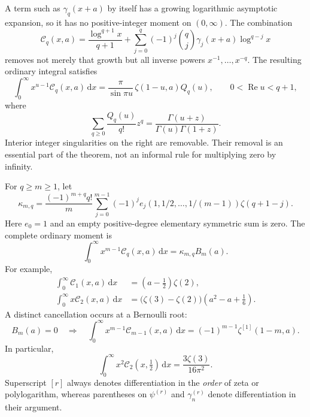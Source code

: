 \documentclass[11pt,letterpaper]{article}
\numberwithin{equation}{section}
\theoremstyle{definition}\newtheorem{definition}[theorem]{Definition}
\theoremstyle{remark}\newtheorem{remark}[theorem]{Remark}
\DeclareMathOperator{\Ree}{Re}
\newcommand{\dd}{\,\mathrm{d}}
\newcommand{\Ccal}{\mathcal C}
\newcommand{\Qcal}{Q}
\begin{document}
A term such as $\gamma_q(x+a)$ by itself has a growing logarithmic
asymptotic expansion, so it has no positive-integer moment on
$(0,\infty)$. The combination
\begin{equation}\label{bsm:eq:C-intro}
 \Ccal_q(x,a)=\frac{\log^{q+1}x}{q+1}
 +\sum_{j=0}^{q}(-1)^j\binom qj\gamma_j(x+a)\log^{q-j}x
\end{equation}
removes not merely that growth but all inverse powers $x^{-1},\ldots,x^{-q}$.
The resulting ordinary integral satisfies
\begin{equation}\label{bsm:eq:intro-master}
 \int_0^\infty x^{u-1}\Ccal_q(x,a)\dd x
 =\frac{\pi}{\sin\pi u}\,\zeta(1-u,a)\Qcal_q(u),
 \qquad 0<\Ree u<q+1,
\end{equation}
where
\begin{equation}\label{bsm:eq:intro-Q}
 \sum_{q\ge0}\frac{\Qcal_q(u)}{q!}z^q
 =\frac{\Gamma(u+z)}{\Gamma(u)\Gamma(1+z)}.
\end{equation}
Interior integer singularities on the right are removable. Their
removal is an essential part of the theorem, not an informal rule for
multiplying zero by infinity.

For $q\ge m\ge1$, let
\begin{equation}\label{bsm:eq:intro-kappa}
 \kappa_{m,q}=\frac{(-1)^{m+q}q!}{m}
 \sum_{j=0}^{m-1}(-1)^j e_j(1,1/2,\ldots,1/(m-1))\zeta(q+1-j).
\end{equation}
Here $e_0=1$ and an empty positive-degree elementary symmetric sum is
zero. The complete ordinary moment is
\begin{equation}\label{bsm:eq:intro-integer}
 \boxed{\displaystyle
 \int_0^\infty x^{m-1}\Ccal_q(x,a)\dd x
       =\kappa_{m,q}B_m(a).}
\end{equation}
For example,
\begin{align}
 \int_0^\infty\Ccal_1(x,a)\dd x
   &=(a-\tfrac12)\zeta(2),\label{bsm:eq:intro-first}\\
 \int_0^\infty x\Ccal_2(x,a)\dd x
   &=\bigl(\zeta(3)-\zeta(2)\bigr)
                  (a^2-a+\tfrac16).\label{bsm:eq:intro-second}
\end{align}
A distinct cancellation occurs at a Bernoulli root:
\begin{equation}\label{bsm:eq:intro-exception}
 B_m(a)=0\quad\Longrightarrow\quad
 \int_0^\infty x^{m-1}\Ccal_{m-1}(x,a)\dd x
           =(-1)^{m-1}\zeta^{[1]}(1-m,a).
\end{equation}
In particular,
\begin{equation}\label{bsm:eq:intro-odd}
 \boxed{\displaystyle
 \int_0^\infty x^2\Ccal_2(x,\tfrac12)\dd x
             =\frac{3\zeta(3)}{16\pi^2}.}
\end{equation}
Superscript $[r]$ always denotes differentiation in the \emph{order}
of zeta or polylogarithm, whereas parentheses on $\psi^{(r)}$ and
$\gamma_n^{(r)}$ denote differentiation in their argument.
\end{document}
